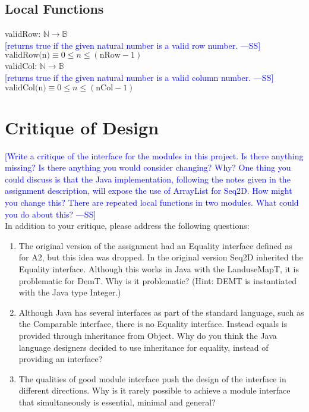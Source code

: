 \documentclass[12pt]{article}
\newcommand{\authornote}[3]{\textcolor{#1}{[#3 ---#2]}}
\newcommand{\authornote}[3]{}
\newcommand{\wss}[1]{\authornote{blue}{SS}{#1}}
\begin{document}
\subsection*{Local Functions}

\noindent validRow: $\mathbb{N} \rightarrow \mathbb{B}$\\
\noindent \wss{returns true if the given natural number is a valid row
  number.}\\
$\mbox{validRow(n)} \equiv 0 \leq n \leq (\mbox{nRow} - 1)$\\

\noindent validCol: $\mathbb{N} \rightarrow \mathbb{B}$\\
\noindent \wss{returns true if the given natural number is a valid column
  number.}\\
$\mbox{validCol(n)} \equiv 0 \leq n \leq (\mbox{nCol} - 1)$\\

\newpage

\section*{Critique of Design}

\wss{Write a critique of the interface for the modules in this project.  Is there
anything missing?  Is there anything you would consider changing?  Why?  One
thing you could discuss is that the Java implementation, following the notes
given in the assignment description, will expose the use of ArrayList for Seq2D.
 How might you change this?  There are repeated local functions in two modules.
What could you do about this?}\\

In addition to your critique, please address the following questions:

\begin{enumerate}
\item The original version of the assignment had an Equality interface defined
  as for A2, but this idea was dropped.  In the original version Seq2D inherited
  the Equality interface.  Although this works in Java with the LanduseMapT, it is
  problematic for DemT.  Why is it problematic?  (Hint: DEMT is instantiated
  with the Java type Integer.)
\item Although Java has several interfaces as part of the standard language,
  such as the Comparable interface, there is no Equality interface.  Instead
  equals is provided through inheritance from Object.  Why do you think the
  Java language designers decided to use inheritance for equality, instead of
  providing an interface?
\item The qualities of good module interface push the design of the interface in
  different directions. Why is it rarely possible to achieve a module interface
  that simultaneously is essential, minimal and general?
\end{enumerate}
\end{document}
